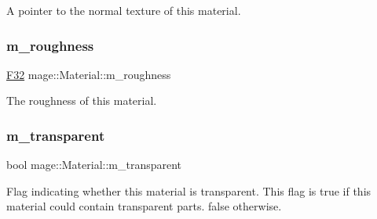 A pointer to the normal texture of this material. \hypertarget{structmage_1_1_material_a2a8a871ee6c18b68c33ce9cdfd23f15f}{}\label{structmage_1_1_material_a2a8a871ee6c18b68c33ce9cdfd23f15f} 
\subsubsection{\texorpdfstring{m\+\_\+roughness}{m\_roughness}}
{\footnotesize\ttfamily \hyperlink{namespacemage_aa97e833b45f06d60a0a9c4fc22ae02c0}{F32} mage\+::\+Material\+::m\+\_\+roughness\hspace{0.3cm}{\ttfamily [private]}}

The roughness of this material. \hypertarget{structmage_1_1_material_abaaf4666e33f4a7952ef9d0801e3f199}{}\label{structmage_1_1_material_abaaf4666e33f4a7952ef9d0801e3f199} 
\subsubsection{\texorpdfstring{m\+\_\+transparent}{m\_transparent}}
{\footnotesize\ttfamily bool mage\+::\+Material\+::m\+\_\+transparent\hspace{0.3cm}{\ttfamily [private]}}

Flag indicating whether this material is transparent. This flag is {\ttfamily true} if this material could contain transparent parts. {\ttfamily false} otherwise. 